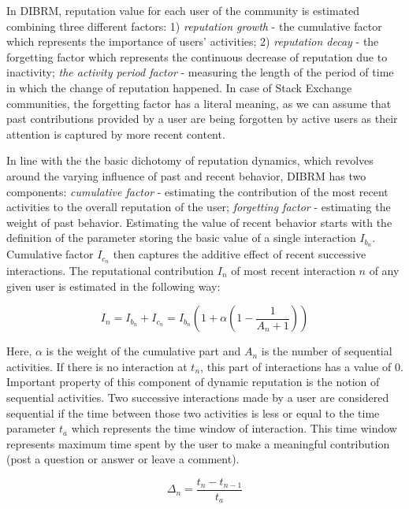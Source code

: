 In DIBRM, reputation value for each user of the community is estimated combining three different factors: 1) \textit{reputation growth} - the cumulative factor which represents the importance of users' activities; 2) \textit{reputation decay} - the forgetting factor which represents the continuous decrease of reputation due to inactivity; \textit{the activity period factor} - measuring the length of the period of time in which the change of reputation happened. In case of Stack Exchange communities, the forgetting factor has a literal meaning, as we can assume that past contributions provided by a user are being forgotten by active users as their attention is captured by more recent content.

In line with the the basic dichotomy of reputation dynamics, which revolves around the varying influence of past and recent behavior, DIBRM has two components: \textit{cumulative factor} - estimating the contribution of the most recent activities to the overall reputation of the user; \textit{forgetting factor} - estimating the weight of past behavior. Estimating the value of recent behavior starts with the definition of the parameter storing the basic value of a single interaction $I_{b_{n}}$. Cumulative factor $I_{c_{n}}$ then captures the additive effect of recent successive interactions. The reputational contribution $I_n$ of most recent interaction $n$ of any given user is estimated in the following way:

\begin{equation}\label{eq:ibn}
I_n = I_{b_{n}} + I_{c_{n}} = I_{b_{n}} (1+  \alpha  (1-\frac{1}{A_{n}+1}))
\end{equation}

Here, $\alpha$ is the weight of the cumulative part and $A_{n}$ is the number of sequential activities. If there is no interaction at $t_n$, this part of interactions has a value of 0. Important property of this component of dynamic reputation is the notion of sequential activities. Two successive interactions made by a user are considered sequential if the time between those two activities is less or equal to the time parameter $t_{a}$ which represents the time window of interaction. This time window represents maximum time spent by the user to make a meaningful contribution (post a question or answer or leave a comment).

\begin{equation}\label{eq:deltan}
\Delta_{n}=\frac{t_{n}-t_{n-1}}{t_{a}}
\end{equation}

